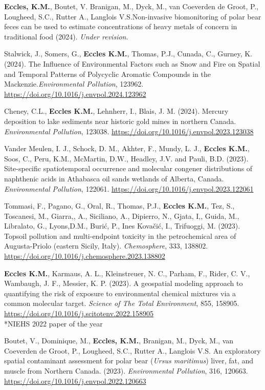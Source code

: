 \documentclass[margin,line]{res}
\begin{document}
\begin{resume}

\textbf{Eccles, K.M.}, Boutet, V. Branigan, M., Dyck, M., van Coeverden de Groot, P., Lougheed, S.C., Rutter A., Langlois V.S.Non-invasive biomonitoring of polar bear feces can be used to estimate concentrations of heavy metals of concern in traditional food (2024). \textit{Under revision}.

Stalwick, J., Somers, G., \textbf{Eccles K.M.}, Thomas, P.J., Cunada, C., Gurney, K. (2024). The Influence of Environmental Factors such as Snow and Fire on Spatial and Temporal Patterns of Polycyclic Aromatic Compounds in the Mackenzie.\textit{Environmental Pollution}, 123962. \url{https://doi.org/10.1016/j.envpol.2024.123962}

Cheney, C.L., \textbf{Eccles K.M.}, Lehnherr, I., Blais, J. M. (2024). Mercury deposition to lake sediments near historic gold mines in northern Canada. \textit{Environmental Pollution}, 123038. \url{https://doi.org/10.1016/j.envpol.2023.123038}

Vander Meulen, I. J., Schock, D. M., Akhter, F., Mundy, L. J., \textbf{Eccles K.M.}, Soos, C., Peru, K.M., McMartin, D.W., Headley, J.V. and Pauli, B.D. (2023). Site-specific spatiotemporal occurrence and molecular congener distributions of naphthenic acids in Athabasca oil sands wetlands of Alberta, Canada. \textit{Environmental Pollution}, 122061. \url{https://doi.org/10.1016/j.envpol.2023.122061}

Tommasi, F., Pagano, G., Oral, R., Thomas, P.J., \textbf{Eccles K.M.}, Tez, S., Toscanesi, M., Giarra,, A., Siciliano, A., Dipierro, N., Gjata, I,, Guida, M., Libralato, G., Lyons,D.M., Burić, P., Ines Kovačić, I.,  Trifuoggi, M. (2023). Topsoil pollution and multi-endpoint toxicity in the petrochemical area of Augusta-Priolo (eastern Sicily, Italy). \textit{Chemosphere}, 333, 138802. \url{https://doi.org/10.1016/j.chemosphere.2023.138802}

\textbf{Eccles K.M.}, Karmaus, A. L., Kleinstreuer, N. C., Parham, F., Rider, C. V., Wambaugh, J. F., Messier, K. P. (2023). A geospatial modeling approach to quantifying the risk of exposure to environmental chemical mixtures via a common molecular target. \textit{Science of The Total Environment}, 855, 158905. \url{https://doi.org/10.1016/j.scitotenv.2022.158905}\\
\mbox{*}NIEHS 2022 paper of the year

Boutet, V., Dominique, M., \textbf{Eccles, K.M.}, Branigan, M., Dyck, M., van Coeverden de Groot, P., Lougheed, S.C., Rutter A., Langlois V.S. An exploratory spatial contaminant assessment for polar bear (\textit{Ursus maritimus}) liver, fat, and muscle from Northern Canada. (2023). \textit{Environmental Pollution}, 316, 120663. \url{https://doi.org/10.1016/j.envpol.2022.120663}


\end{resume}
\end{document}
